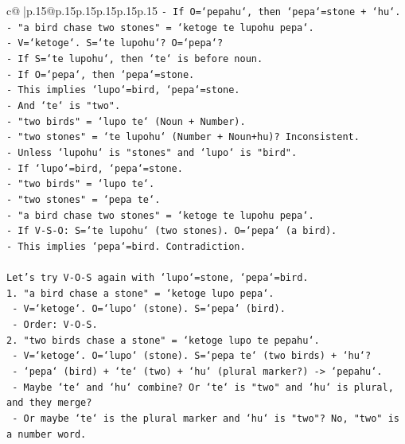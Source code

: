 \documentclass{article}
\begin{document}
{\begin{supertabular}{c@{$\;$}|p{.15\linewidth}@{}p{.15\linewidth}p{.15\linewidth}p{.15\linewidth}p{.15\linewidth}p{.15\linewidth}}
{{{\texttt{{-} If O=`pepahu`, then `pepa`=stone + `hu`.} \\
\texttt{{-} "a bird chase two stones" = `ketoge te lupohu pepa`.} \\
\texttt{{-} V=`ketoge`. S=`te lupohu`? O=`pepa`?} \\
\texttt{{-} If S=`te lupohu`, then `te` is before noun.} \\
\texttt{{-} If O=`pepa`, then `pepa`=stone.} \\
\texttt{{-} This implies `lupo`=bird, `pepa`=stone.} \\
\texttt{{-} And `te` is "two".} \\
\texttt{{-} "two birds" = `lupo te` (Noun + Number).} \\
\texttt{{-} "two stones" = `te lupohu` (Number + Noun+hu)? Inconsistent.} \\
\texttt{{-} Unless `lupohu` is "stones" and `lupo` is "bird".} \\
\texttt{{-} If `lupo`=bird, `pepa`=stone.} \\
\texttt{{-} "two birds" = `lupo te`.} \\
\texttt{{-} "two stones" = `pepa te`.} \\
\texttt{{-} "a bird chase two stones" = `ketoge te lupohu pepa`.} \\
\texttt{{-} If V{-}S{-}O: S=`te lupohu` (two stones). O=`pepa` (a bird).} \\
\texttt{{-} This implies `pepa`=bird. Contradiction.} \\
\\ 
\texttt{Let's try V{-}O{-}S again with `lupo`=stone, `pepa`=bird.} \\
\texttt{1. "a bird chase a stone" = `ketoge lupo pepa`.} \\
\texttt{   {-} V=`ketoge`. O=`lupo` (stone). S=`pepa` (bird).} \\
\texttt{   {-} Order: V{-}O{-}S.} \\
\texttt{2. "two birds chase a stone" = `ketoge lupo te pepahu`.} \\
\texttt{   {-} V=`ketoge`. O=`lupo` (stone). S=`pepa te` (two birds) + `hu`?} \\
\texttt{   {-} `pepa` (bird) + `te` (two) + `hu` (plural marker?) {-}> `pepahu`.} \\
\texttt{   {-} Maybe `te` and `hu` combine? Or `te` is "two" and `hu` is plural, and they merge?} \\
\texttt{   {-} Or maybe `te` is the plural marker and `hu` is "two"? No, "two" is a number word.} \\
}}}
\end{supertabular}}
\end{document}
